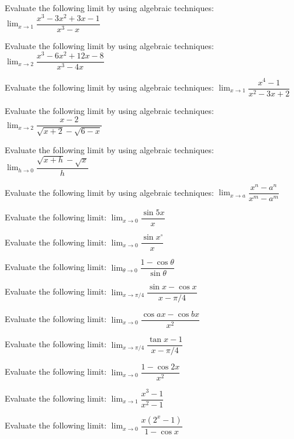 \documentclass[11pt,a4paper]{article}
\begin{document}
\begin{shortlist}
\item Evaluate the following limit by using algebraic techniques: $\displaystyle\lim_{x\to1}\dfrac{x^3-3x^2+3x-1}{x^3-x}$

\item Evaluate the following limit by using algebraic techniques: $\displaystyle\lim_{x\to2}\dfrac{x^3-6x^2+12x-8}{x^3-4x}$

\item Evaluate the following limit by using algebraic techniques: $\displaystyle\lim_{x\to1}\dfrac{x^4-1}{x^2-3x+2}$

\item Evaluate the following limit by using algebraic techniques: $\displaystyle\lim_{x\to2}\dfrac{x-2}{\sqrt{x+2}-\sqrt{6-x}}$

\item Evaluate the following limit by using algebraic techniques: $\displaystyle\lim_{h\to0}\dfrac{\sqrt{x+h}-\sqrt{x}}{h}$

\item Evaluate the following limit by using algebraic techniques: $\displaystyle\lim_{x\to a}\dfrac{x^n-a^n}{x^m-a^m}$

\item Evaluate the following limit: $\displaystyle\lim_{x\to0}\dfrac{\sin5x}{x}$

\item Evaluate the following limit: $\displaystyle\lim_{x\to0}\dfrac{\sin x^{\circ}}{x}$

\item Evaluate the following limit: $\displaystyle\lim_{\theta\to0}\dfrac{1-\cos\theta}{\sin\theta}$

\item Evaluate the following limit: $\displaystyle\lim_{x\to\pi/4}\dfrac{\sin x-\cos x}{x-\pi/4}$

\item Evaluate the following limit: $\displaystyle\lim_{x\to0}\dfrac{\cos ax-\cos bx}{x^2}$

\item Evaluate the following limit: $\displaystyle\lim_{x\to\pi/4}\dfrac{\tan x-1}{x-\pi/4}$

\item Evaluate the following limit: $\displaystyle\lim_{x\to0}\dfrac{1-\cos2x}{x^2}$

\item Evaluate the following limit: $\displaystyle\lim_{x\to1}\dfrac{x^3-1}{x^2-1}$

\item Evaluate the following limit: $\displaystyle\lim_{x\to0}\dfrac{x(2^x-1)}{1-\cos x}$


\end{shortlist}
\end{document}
